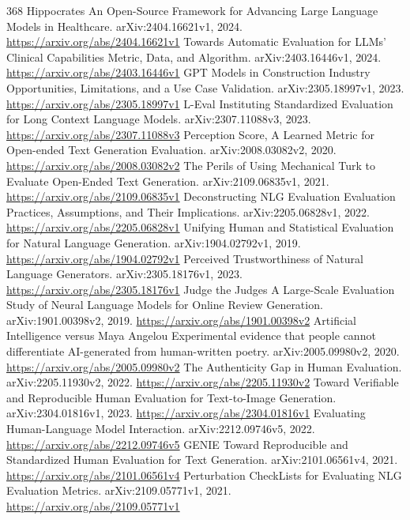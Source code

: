 \documentclass[11pt]{article}
\begin{document}
\begin{thebibliography}{368}
 Hippocrates An Open-Source Framework for Advancing Large Language Models in Healthcare. arXiv:2404.16621v1, 2024. \url{https://arxiv.org/abs/2404.16621v1}
 Towards Automatic Evaluation for LLMs' Clinical Capabilities Metric, Data, and Algorithm. arXiv:2403.16446v1, 2024. \url{https://arxiv.org/abs/2403.16446v1}
 GPT Models in Construction Industry Opportunities, Limitations, and a Use Case Validation. arXiv:2305.18997v1, 2023. \url{https://arxiv.org/abs/2305.18997v1}
 L-Eval Instituting Standardized Evaluation for Long Context Language Models. arXiv:2307.11088v3, 2023. \url{https://arxiv.org/abs/2307.11088v3}
 Perception Score, A Learned Metric for Open-ended Text Generation Evaluation. arXiv:2008.03082v2, 2020. \url{https://arxiv.org/abs/2008.03082v2}
 The Perils of Using Mechanical Turk to Evaluate Open-Ended Text Generation. arXiv:2109.06835v1, 2021. \url{https://arxiv.org/abs/2109.06835v1}
 Deconstructing NLG Evaluation Evaluation Practices, Assumptions, and Their Implications. arXiv:2205.06828v1, 2022. \url{https://arxiv.org/abs/2205.06828v1}
 Unifying Human and Statistical Evaluation for Natural Language Generation. arXiv:1904.02792v1, 2019. \url{https://arxiv.org/abs/1904.02792v1}
 Perceived Trustworthiness of Natural Language Generators. arXiv:2305.18176v1, 2023. \url{https://arxiv.org/abs/2305.18176v1}
 Judge the Judges A Large-Scale Evaluation Study of Neural Language Models for Online Review Generation. arXiv:1901.00398v2, 2019. \url{https://arxiv.org/abs/1901.00398v2}
 Artificial Intelligence versus Maya Angelou Experimental evidence that people cannot differentiate AI-generated from human-written poetry. arXiv:2005.09980v2, 2020. \url{https://arxiv.org/abs/2005.09980v2}
 The Authenticity Gap in Human Evaluation. arXiv:2205.11930v2, 2022. \url{https://arxiv.org/abs/2205.11930v2}
 Toward Verifiable and Reproducible Human Evaluation for Text-to-Image Generation. arXiv:2304.01816v1, 2023. \url{https://arxiv.org/abs/2304.01816v1}
 Evaluating Human-Language Model Interaction. arXiv:2212.09746v5, 2022. \url{https://arxiv.org/abs/2212.09746v5}
 GENIE Toward Reproducible and Standardized Human Evaluation for Text Generation. arXiv:2101.06561v4, 2021. \url{https://arxiv.org/abs/2101.06561v4}
 Perturbation CheckLists for Evaluating NLG Evaluation Metrics. arXiv:2109.05771v1, 2021. \url{https://arxiv.org/abs/2109.05771v1}

\end{thebibliography}
\end{document}
